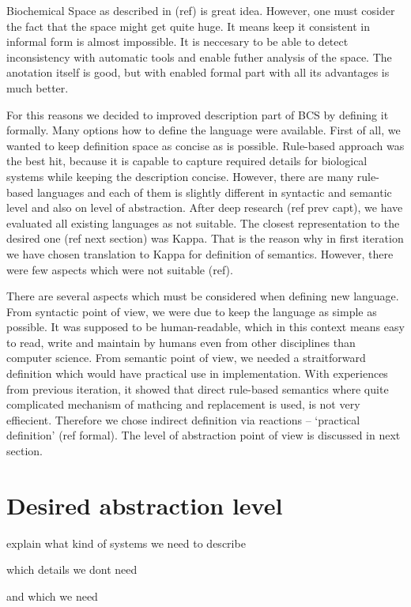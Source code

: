 \documentclass[12pt]{fithesis2}
\begin{document}
Biochemical Space as described in (ref) is great idea. However, one must cosider the fact that the space might get quite huge. It means keep it consistent in informal form is almost impossible. It is neccesary to be able to detect inconsistency with automatic tools and enable futher analysis of the space. The anotation itself is good, but with enabled formal part with all its advantages is much better. 

For this reasons we decided to improved description part of BCS by defining it formally. Many options how to define the language were available. First of all, we wanted to keep definition space as concise as is possible. Rule-based approach was the best hit, because it is capable to capture required details for biological systems while keeping the description concise. However, there are many rule-based languages and each of them is slightly different in syntactic and semantic level and also on level of abstraction. After deep research (ref prev capt), we have evaluated all existing languages as not suitable. The closest representation to the desired one (ref next section) was Kappa. That is the reason why in first iteration we have chosen translation to Kappa for definition of semantics. However, there were few aspects which were not suitable (ref).

There are several aspects which must be considered when defining new language. From syntactic point of view, we were due to keep the language as simple as possible. It was supposed to be human-readable, which in this context means easy to read, write and maintain by humans even from other disciplines than computer science. From semantic point of view, we needed a straitforward definition which would have practical use in implementation. With experiences from previous iteration, it showed that direct rule-based semantics where quite complicated mechanism of mathcing and replacement is used, is not very effiecient. Therefore we chose indirect definition via reactions -- `practical definition' (ref formal). The level of abstraction point of view is discussed in next section.

\section{Desired abstraction level}

explain what kind of systems we need to describe

which details we dont need

and which we need
\end{document}
